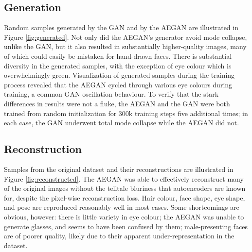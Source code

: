 \documentclass{article}
\begin{document}
\subsection{Generation}
Random samples generated by the GAN and by the AEGAN are illustrated in Figure \ref{fig:generated}. Not only did the AEGAN's generator avoid mode collapse, unlike the GAN, but it also resulted in substantially higher-quality images, many of which could easily be mistaken for hand-drawn faces. There is substantial diversity in the generated samples, with the exception of eye colour which is overwhelmingly green. Visualization of generated samples during the training process revealed that the AEGAN cycled through various eye colours during training, a common GAN oscillation behaviour. To verify that the stark differences in results were not a fluke, the AEGAN and the GAN were both trained from random initialization for 300k training steps five additional times; in each case, the GAN underwent total mode collapse while the AEGAN did not.
 
\subsection{Reconstruction}
Samples from the original dataset and their reconstructions are illustrated in Figure \ref{fig:reconstructed}. The AEGAN was able to effectively reconstruct many of the original images without the telltale bluriness that autoencoders are known for, despite the pixel-wise reconstruction loss. Hair colour, face shape, eye shape, and pose are reproduced reasonably well in most cases. Some shortcomings are obvious, however: there is little variety in eye colour; the AEGAN was unable to generate glasses, and seems to have been confused by them; male-presenting faces are of poorer quality, likely due to their apparent under-representation in the dataset.
\end{document}
